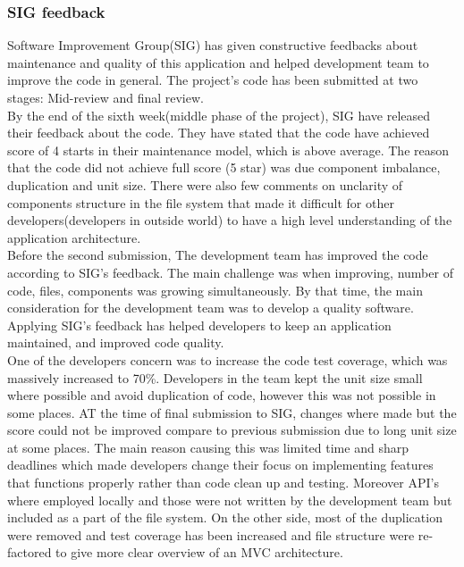 \subsubsection{SIG feedback} %
Software Improvement Group(SIG) has given constructive feedbacks about maintenance and quality of this application and helped development team to improve the code in general. The project's code has been submitted at two stages: Mid-review and final review.\\

By the end of the sixth week(middle phase of the project), SIG have released their feedback about the code. They have stated that the code have achieved score of 4 starts in their maintenance model, which is above average. The reason that the code did not achieve full score (5 star) was due component imbalance, duplication and unit size. There were also few comments on unclarity of components structure in the file system that made it difficult for other developers(developers in outside world) to have a high level understanding of the application architecture.\\

Before the second submission, The development team has improved the code according to SIG's feedback. The main challenge was when improving, number of code, files, components was growing simultaneously. By that time, the main consideration for the development team was to develop a quality software. Applying SIG's feedback has helped developers to keep an application maintained, and improved code quality.\\
 
One of the developers concern was to increase the code test coverage, which was massively increased to 70\%. Developers in the team kept the unit size small where possible and avoid duplication of code, however this was not possible in some places. AT the time of final submission to SIG, changes where made but the score could not be improved compare to previous submission due to long unit size at some places. The main reason causing this was limited time and sharp deadlines which made developers change their focus on implementing features that functions properly rather than code clean up and testing. Moreover API's where employed locally and those were not written by the development team but included as a part of the file system. On the other side, most of the duplication were removed and test coverage has been increased and file structure were re-factored to give more clear overview of an MVC architecture.\\ 




